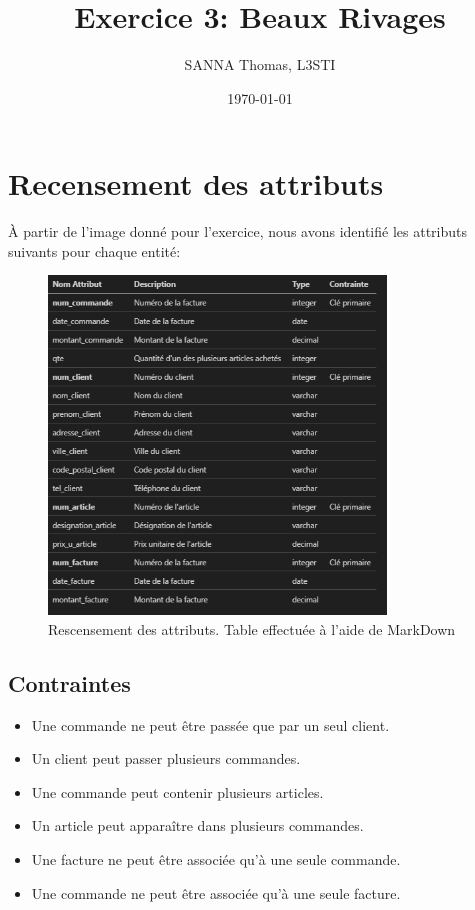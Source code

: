 \documentclass[a4paper,11pt]{article}
\title{Exercice 3: Beaux Rivages}
\author{SANNA Thomas, L3STI}
\date{\today}
\begin{document}
\maketitle

\section{Recensement des attributs}
À partir de l'image donné pour l'exercice, nous avons identifié les attributs suivants pour chaque entité:

\begin{figure}[H] 
    \centering
    \includegraphics[width=0.8\textwidth]{image.png}
    \caption{Rescensement des attributs. Table effectuée à l'aide de MarkDown}
    \label{fig:image}
\end{figure}

\subsection*{Contraintes}
\begin{itemize}
    \item Une commande ne peut être passée que par un seul client.
    \item Un client peut passer plusieurs commandes.
    \item Une commande peut contenir plusieurs articles.
    \item Un article peut apparaître dans plusieurs commandes.
    \item Une facture ne peut être associée qu'à une seule commande.
    \item Une commande ne peut être associée qu'à une seule facture.
\end{itemize}
\end{document}
